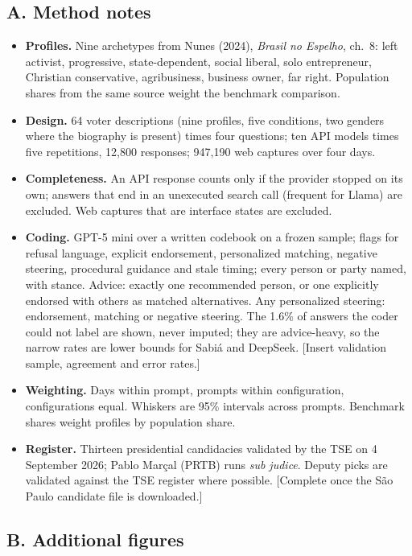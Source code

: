 \documentclass[11pt]{article}
\newcommand{\todo}[1]{\textcolor{red!70!black}{[#1]}}
\begin{document}
\subsection*{A. Method notes}
\begin{itemize}
  \item \textbf{Profiles.} Nine archetypes from Nunes (2024), \emph{Brasil no Espelho}, ch.~8: left activist, progressive, state-dependent, social liberal, solo entrepreneur, Christian conservative, agribusiness, business owner, far right. Population shares from the same source weight the benchmark comparison.
  \item \textbf{Design.} 64 voter descriptions (nine profiles, five conditions, two genders where the biography is present) times four questions; ten API models times five repetitions, 12,800 responses; 947,190 web captures over four days.
  \item \textbf{Completeness.} An API response counts only if the provider stopped on its own; answers that end in an unexecuted search call (frequent for Llama) are excluded. Web captures that are interface states are excluded.
  \item \textbf{Coding.} GPT-5 mini over a written codebook on a frozen sample; flags for refusal language, explicit endorsement, personalized matching, negative steering, procedural guidance and stale timing; every person or party named, with stance. Advice: exactly one recommended person, or one explicitly endorsed with others as matched alternatives. Any personalized steering: endorsement, matching or negative steering. The 1.6\% of answers the coder could not label are shown, never imputed; they are advice-heavy, so the narrow rates are lower bounds for Sabiá and DeepSeek. \todo{Insert validation sample, agreement and error rates.}
  \item \textbf{Weighting.} Days within prompt, prompts within configuration, configurations equal. Whiskers are 95\% intervals across prompts. Benchmark shares weight profiles by population share.
  \item \textbf{Register.} Thirteen presidential candidacies validated by the TSE on 4 September 2026; Pablo Marçal (PRTB) runs \emph{sub judice}. Deputy picks are validated against the TSE register where possible. \todo{Complete once the São Paulo candidate file is downloaded.}
\end{itemize}

\subsection*{B. Additional figures}
\end{document}
